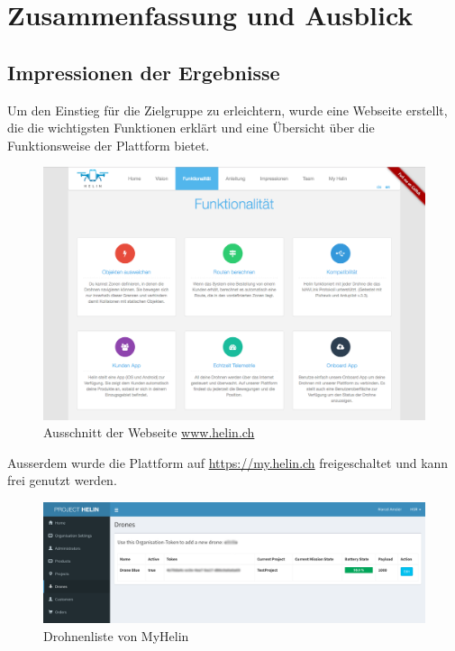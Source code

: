 \chapter{Zusammenfassung und Ausblick}

\section{Impressionen der Ergebnisse}

Um den Einstieg für die Zielgruppe zu erleichtern, wurde eine Webseite erstellt, die die wichtigsten Funktionen erklärt und eine Übersicht über die Funktionsweise der Plattform bietet.

\begin{figure}[H]
	\centering
	\includegraphics[width=1\textwidth] {images/website.png}
	\caption{Ausschnitt der Webseite \url{www.helin.ch}}
\end{figure}
\newpage

Ausserdem wurde die Plattform auf \url{https://my.helin.ch} freigeschaltet und kann frei genutzt werden.

\begin{figure}[H]
	\centering
	\includegraphics[width=1.0\textwidth] {images/myhelin.png}
	\caption{Drohnenliste von MyHelin}
\end{figure}

